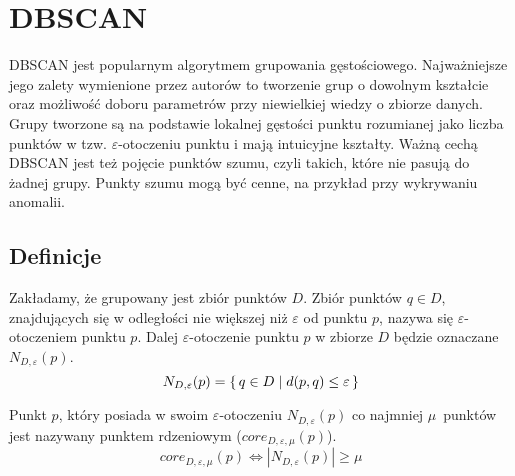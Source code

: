 \section{DBSCAN}
DBSCAN \cite{dbscan} jest popularnym algorytmem grupowania gęstościowego. Najważniejsze jego zalety wymienione przez autorów to tworzenie grup o dowolnym kształcie oraz możliwość doboru parametrów przy niewielkiej wiedzy o zbiorze danych. Grupy tworzone są na podstawie lokalnej gęstości punktu rozumianej jako liczba punktów w tzw. $ \varepsilon $-otoczeniu punktu i mają intuicyjne kształty. Ważną cechą DBSCAN jest też pojęcie punktów szumu, czyli takich, które nie pasują do żadnej grupy. Punkty szumu mogą być cenne, na przykład przy wykrywaniu anomalii.

\subsection{Definicje}

\newline
Zakładamy, że grupowany jest zbiór punktów $ D $. Zbiór punktów $ q \in D $, znajdujących się w odległości nie większej niż $ \varepsilon $ od punktu $ p $, nazywa się $ \varepsilon $-otoczeniem punktu $ p $. Dalej $\varepsilon$-otoczenie punktu $ p $ w zbiorze $ D $ będzie oznaczane $ N_{D,\varepsilon}(p) $.
\begin{equation}\label{eq:eps-neighbourhood}
	N_{D,\varepsilon}(p) = \set{q \in D | d(p, q) \le \varepsilon}
\end{equation}

\newline
Punkt $ p $, który posiada w swoim $ \varepsilon $-otoczeniu $ N_{D,\varepsilon}(p) $ co najmniej \mbox{$ \mu $ punktów} jest nazywany punktem rdzeniowym ($ core_{D,\varepsilon,\mu}(p) $).
\begin{equation}\label{core-point}
	core_{D,\varepsilon,\mu}(p) \iff |N_{D,\varepsilon}(p)| \ge \mu
\end{equation}



